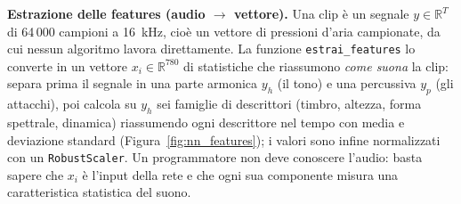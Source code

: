 \documentclass[a4paper,12pt]{article}
\numberwithin{equation}{section}
\numberwithin{figure}{section}
\numberwithin{table}{section}
\begin{document}
\textbf{Estrazione delle features (audio $\to$ vettore).}
Una clip è un segnale $y \in \mathbb{R}^T$ di 64\,000 campioni a 16~kHz, cioè un
vettore di pressioni d'aria campionate, da cui nessun algoritmo lavora
direttamente. La funzione \texttt{estrai\_features} lo converte in un vettore
$x_i \in \mathbb{R}^{780}$ di statistiche che riassumono \emph{come suona} la
clip: separa prima il segnale in una parte armonica $y_h$ (il tono) e una
percussiva $y_p$ (gli attacchi), poi calcola su $y_h$ sei famiglie di
descrittori (timbro, altezza, forma spettrale, dinamica) riassumendo ogni
descrittore nel tempo con media e deviazione standard
(Figura~\ref{fig:nn_features}); i valori sono infine normalizzati con un
\texttt{RobustScaler}. Un programmatore non deve conoscere l'audio: basta
sapere che $x_i$ è l'input della rete e che ogni sua componente misura una
caratteristica statistica del suono.
\end{document}
